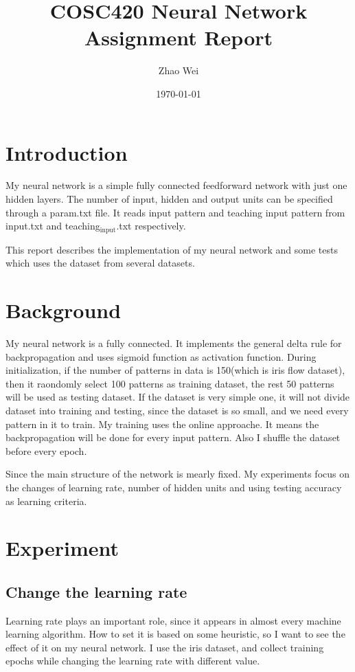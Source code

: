 \documentclass[11pt]{article}
\author{Zhao Wei}
\date{\today}
\title{COSC420 Neural Network Assignment Report}
\begin{document}
\maketitle
\tableofcontents


\section{Introduction}
\label{sec-1}
My neural network is a simple fully connected feedforward network with just one hidden layers. The number of input, hidden and output units can be specified through a param.txt file. It reads input pattern and teaching input pattern from input.txt and teaching$_{\text{input}}$.txt respectively. 

This report describes the implementation of my neural network and some tests which uses the dataset from several datasets. 
\section{Background}
\label{sec-2}
My neural network is a fully connected. It implements the general delta rule for backpropagation and uses sigmoid function as activation function. During initialization, if the number of patterns in data is 150(which is iris flow dataset), then it raondomly select 100 patterns as training dataset, the rest 50 patterns will be used as testing dataset. If the dataset is very simple one, it will not divide dataset into training and testing, since the dataset is so small, and we need every pattern in it to train. My training uses the online approache. It means the backpropagation will be done for every input pattern. Also I shuffle the dataset before every epoch.

Since the main structure of the network is mearly fixed. My experiments focus on the changes of learning rate, number of hidden units and using testing accuracy as learning criteria.

\section{Experiment}
\label{sec-3}
\subsection{Change the learning rate}
\label{sec-3-1}
Learning rate plays an important role, since it appears in almost every machine learning algorithm. How to set it is based on some heuristic, so I want to see the effect of it on my neural network. I use the iris dataset, and collect training epochs while changing the learning rate with different value.
\end{document}
